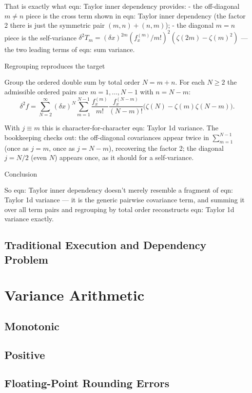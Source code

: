 \documentclass[twoside]{article}
\numberwithin{equation}{section}
\begin{document}
That is exactly what eqn: Taylor inner dependency provides:
- the off-diagonal $m\neq n$ piece is the cross term shown in eqn: Taylor inner dependency (the factor 2 there is just the symmetric pair $(m,n)+(n,m)$);
- the diagonal $m=n$ piece is the self-variance $\delta^2 T_m = (\delta x)^{2m}(f^{(m)}_x/m!)^2(\zeta(2m)-\zeta(m)^2)$ — the two leading terms of eqn: sum variance.

Regrouping reproduces the target

Group the ordered double sum by total order $N = m+n$. For each $N\ge 2$ the admissible ordered pairs are $m = 1,\dots,N-1$ with $n = N-m$:
$$\delta^2 f = \sum_{N=2}^{\infty}(\delta x)^N \sum_{m=1}^{N-1}\frac{f^{(m)}_x}{m!}\frac{f^{(N-m)}_x}{(N-m)!}\big(\zeta(N) - \zeta(m)\zeta(N-m)\big).$$

With $j \equiv m$ this is character-for-character eqn: Taylor 1d variance. The bookkeeping checks out: the off-diagonal covariances appear twice in $\sum_{m=1}^{N-1}$ (once as $j=m$, once as $j=N-m$), recovering the factor 2; the diagonal $j=N/2$ (even $N$) appears once, as it should for a self-variance.

Conclusion

So eqn: Taylor inner dependency doesn't merely resemble a fragment of eqn: Taylor 1d variance — it is the generic pairwise covariance term, and summing it over all term pairs and regrouping by total order reconstructs eqn: Taylor 1d variance exactly.
\fi

\subsection{Traditional Execution and Dependency Problem}

\section{Variance Arithmetic}

\subsection{Monotonic}

\subsection{Positive}

\subsection{Floating-Point Rounding Errors}
\end{document}

